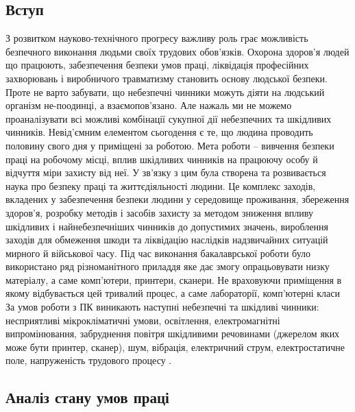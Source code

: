 \documentclass[12pt,a4paper]{article}
\begin{document}
\subsection{Вступ}
З розвитком науково-технічного прогресу важливу роль грає можливість безпечного виконання людьми своїх трудових обов'язків.
Охорона здоров'я людей що працюють, забезпечення безпеки умов праці, ліквідація професійних захворювань і виробничого травматизму становить основу людської безпеки. Проте не варто забувати, що небезпечні чинники можуть діяти на людський організм не-поодинці, а взаємопов’язано. Але нажаль ми не можемо проаналізувати всі можливі комбінації сукупної дії небезпечних та шкідливих чинників. Невід’ємним елементом сьогодення є те, що людина проводить половину свого дня у приміщені за роботою.
Мета роботи – вивчення безпеки праці на робочому місці, вплив шкідливих чинників на працюючу особу й відчуття міри захисту від неї.
У зв’язку з цим була створена та розвивається наука про безпеку праці та життєдіяльності людини. Це комплекс заходів, вкладених у забезпечення безпеки людини у середовище проживання, збереження здоров'я, розробку методів і засобів захисту за методом зниження впливу шкідливих і найнебезпечніших чинників до допустимих значень, вироблення заходів для обмеження шкоди та ліквідацію наслідків надзвичайних ситуацій мирного й військової часу.
Під час виконання бакалаврської роботи було використано ряд різноманітного приладдя яке дає змогу опрацьовувати низку матеріалу, а саме комп’ютери, принтери, сканери. Не враховуючи приміщення в якому відбувається цей тривалий процес, а саме лабораторії, комп’ютерні класи
За умов роботи з ПК виникають наступні небезпечні та шкідливі чинники: несприятливі мікрокліматичні умови, освітлення, електромагнітні випромінювання, забруднення повітря шкідливими речовинами (джерелом яких може бути принтер, сканер), шум, вібрація, електричний струм, електростатичне поле, напруженість трудового процесу .


\subsection{Аналіз стану умов праці}
\end{document}

